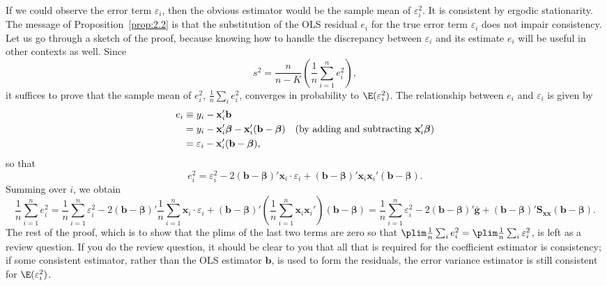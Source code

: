 If we could observe the error term $\varepsilon_i$, then the obvious estimator would
be the sample mean of $\varepsilon_i^2$.  It is consistent by ergodic stationarity.
The message of Proposition~\ref{prop:2.2} is that the substitution of the OLS
residual $e_i$ for the true error term $\varepsilon_i$ does not impair consistency.
Let us go through a sketch of the proof, because knowing how to handle the
discrepancy between $\varepsilon_i$ and its estimate $e_i$ will be useful in other
contexts as well.  Since
\[
  s^2 = \frac{n}{n - K}\left(\frac{1}{n}\sum_{i=1}^{n} e_i^2\right),
\]
it suffices to prove that the sample mean of $e_i^2$,
$\frac{1}{n}\sum_i e_i^2$, converges in probability to $\E(\varepsilon_i^2)$.
The relationship between $e_i$ and $\varepsilon_i$ is given by
\begin{align}
  e_i &\equiv y_i - \mathbf{x}_i'\mathbf{b} \notag \\
  &= y_i - \mathbf{x}_i'\bm{\beta} - \mathbf{x}_i'(\mathbf{b} - \bm{\beta})
     \quad (\text{by adding and subtracting } \mathbf{x}_i'\bm{\beta}) \notag \\
  &= \varepsilon_i - \mathbf{x}_i'(\mathbf{b} - \bm{\beta}),
  \label{eq:2.3.9}
\end{align}
so that
\begin{equation}
  e_i^2 = \varepsilon_i^2
  - 2(\mathbf{b} - \bm{\beta})'\mathbf{x}_i \cdot \varepsilon_i
  + (\mathbf{b} - \bm{\beta})'\mathbf{x}_i\mathbf{x}_i'(\mathbf{b} - \bm{\beta}).
  \label{eq:2.3.10}
\end{equation}
Summing over $i$, we obtain
\begin{equation}
  \frac{1}{n}\sum_{i=1}^{n} e_i^2
  = \frac{1}{n}\sum_{i=1}^{n} \varepsilon_i^2
  - 2(\mathbf{b} - \bm{\beta})'\frac{1}{n}\sum_{i=1}^{n}
    \mathbf{x}_i \cdot \varepsilon_i
  + (\mathbf{b} - \bm{\beta})'\left(\frac{1}{n}\sum_{i=1}^{n}
    \mathbf{x}_i\mathbf{x}_i'\right)(\mathbf{b} - \bm{\beta})
  = \frac{1}{n}\sum_{i=1}^{n} \varepsilon_i^2
  - 2(\mathbf{b} - \bm{\beta})'\bar{\mathbf{g}}
  + (\mathbf{b} - \bm{\beta})'\mathbf{S}_{\mathbf{xx}}
    (\mathbf{b} - \bm{\beta}).
  \label{eq:2.3.11}
\end{equation}
The rest of the proof, which is to show that the plims of the last two terms are zero
so that $\plim \frac{1}{n}\sum_i e_i^2 = \plim \frac{1}{n}\sum_i \varepsilon_i^2$,
is left as a review question.  If you do the review question, it should be clear to
you that all that is required for the coefficient estimator is consistency; if some
consistent estimator, rather than the OLS estimator $\mathbf{b}$, is used to form
the residuals, the error variance estimator is still consistent for $\E(\varepsilon_i^2)$.
